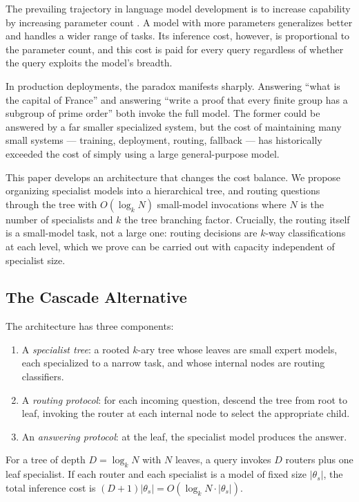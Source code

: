 \documentclass[11pt,a4paper]{article}
\theoremstyle{definition}
\theoremstyle{remark}
\begin{document}
The prevailing trajectory in language model development is to increase capability by increasing parameter count \citep{kaplan2020scaling, hoffmann2022training}. A model with more parameters generalizes better and handles a wider range of tasks. Its inference cost, however, is proportional to the parameter count, and this cost is paid for every query regardless of whether the query exploits the model's breadth.

In production deployments, the paradox manifests sharply. Answering ``what is the capital of France'' and answering ``write a proof that every finite group has a subgroup of prime order'' both invoke the full model. The former could be answered by a far smaller specialized system, but the cost of maintaining many small systems --- training, deployment, routing, fallback --- has historically exceeded the cost of simply using a large general-purpose model.

This paper develops an architecture that changes the cost balance. We propose organizing specialist models into a hierarchical tree, and routing questions through the tree with $O(\log_k N)$ small-model invocations where $N$ is the number of specialists and $k$ the tree branching factor. Crucially, the routing itself is a small-model task, not a large one: routing decisions are $k$-way classifications at each level, which we prove can be carried out with capacity independent of specialist size.

\subsection{The Cascade Alternative}

The architecture has three components:

\begin{enumerate}
    \item A \emph{specialist tree}: a rooted $k$-ary tree whose leaves are small expert models, each specialized to a narrow task, and whose internal nodes are routing classifiers.
    \item A \emph{routing protocol}: for each incoming question, descend the tree from root to leaf, invoking the router at each internal node to select the appropriate child.
    \item An \emph{answering protocol}: at the leaf, the specialist model produces the answer.
\end{enumerate}

For a tree of depth $D = \log_k N$ with $N$ leaves, a query invokes $D$ routers plus one leaf specialist. If each router and each specialist is a model of fixed size $|\theta_s|$, the total inference cost is $(D + 1) |\theta_s| = O(\log_k N \cdot |\theta_s|)$.
\end{document}

